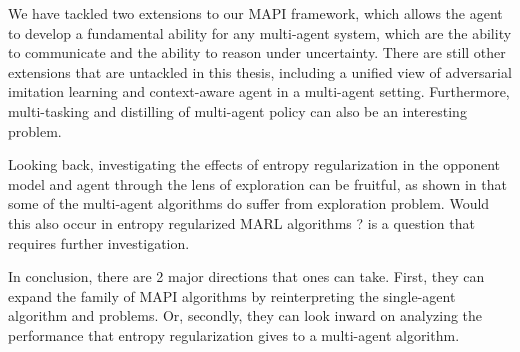 \label{sec:chap6-future-work}
We have tackled two extensions to our MAPI framework, which allows the agent to develop a fundamental ability for any multi-agent system, which are the ability to communicate and the ability to reason under uncertainty. There are still other extensions that are untackled in this thesis, including a unified view of adversarial imitation learning and context-aware agent in a multi-agent setting. Furthermore, multi-tasking and distilling of multi-agent policy can also be an interesting problem. 

Looking back, investigating the effects of entropy regularization in the opponent model and agent through the lens of exploration can be fruitful, as shown in \cite{mahajan2019maven} that some of the multi-agent algorithms do suffer from exploration problem. Would this also occur in entropy regularized MARL algorithms ? is a question that requires further investigation.

In conclusion, there are 2 major directions that ones can take. First, they can expand the family of MAPI algorithms by reinterpreting the single-agent algorithm and problems. Or, secondly, they can look inward on analyzing the performance that entropy regularization gives to a multi-agent algorithm. 